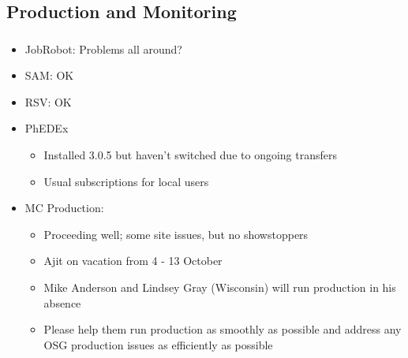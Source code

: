 \documentclass{beamer}
\begin{document}
\subsection{Production and Monitoring}
\begin{frame}
\frametitle{}
\begin{itemize}
    \item JobRobot: Problems all around?
    \item SAM: OK
    \item RSV: OK
    \item PhEDEx
    \begin{itemize}
        \item Installed 3.0.5 but haven't switched due to ongoing transfers
        \item Usual subscriptions for local users
    \end{itemize}
    \item MC Production:
    \begin{itemize}
        \item Proceeding well; some site issues, but no showstoppers
        \item Ajit on vacation from 4 - 13 October
        \item Mike Anderson and Lindsey Gray (Wisconsin) will run production in his absence
        \item Please help them run production as smoothly as possible and address any OSG production issues as efficiently as possible
    \end{itemize}
\end{itemize}
\end{frame}
\end{document}
